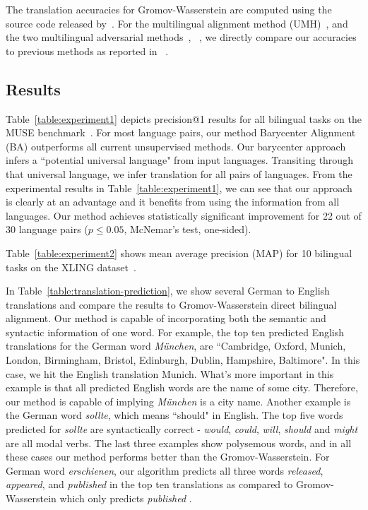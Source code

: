 \documentclass{article}
\begin{document}
The translation accuracies for Gromov-Wasserstein are computed using the source code released by~\cite{AlvarezMelisJaakkola18}.
For the multilingual alignment method (UMH)~\cite{AlauxGCJ19}, and the two multilingual adversarial methods~\cite{ChenCardie18}, ~\cite{TaitelbaumCG19a},
we directly compare our accuracies to previous methods as reported in ~\cite{glavas-etal-2019-properly}.


\subsection{Results} Table~\ref{table:experiment1} depicts precision@1 results for all bilingual tasks on the MUSE benchmark~\cite{LampleCRDJ18}. For most language pairs, our method Barycenter Alignment (BA) outperforms all current unsupervised methods. Our barycenter approach infers a ``potential universal language" from input languages. Transiting through that universal language, we infer translation for all pairs of languages. From the experimental results in Table~\ref{table:experiment1}, we can see that our approach is clearly at an advantage and it benefits from using the information from all languages. Our method achieves statistically significant improvement for 22 out of 30 language pairs ($p \leq 0.05$, McNemar's test, one-sided).

Table~\ref{table:experiment2} shows mean average precision (MAP) for 10 bilingual tasks on the XLING dataset~\cite{glavas-etal-2019-properly}.

 In Table~\ref{table:translation-prediction}, we show several German to English translations and compare the results to Gromov-Wasserstein direct bilingual alignment. Our method is capable of incorporating both the semantic and syntactic information of one word.
For example, the top ten predicted English translations for the German word \textit{München}, are ``Cambridge, Oxford, Munich, London, Birmingham, Bristol, Edinburgh, Dublin, Hampshire, Baltimore". In this case, we hit the English translation Munich. What's more important in this example is that all predicted English words are the name of some city. Therefore, our method is capable of implying \textit{München} is a city name.
Another example is the German word \textit{sollte}, which means ``should" in English.
The top five words predicted for \textit{sollte} are syntactically correct - \textit{would}, \textit{could}, \textit{will}, \textit{should} and \textit{might} are all modal verbs. 
The last three examples show polysemous words, and in all these cases our method performs better than the Gromov-Wasserstein. For German word \textit{erschienen}, our algorithm predicts all three words {\it released}, {\it appeared}, and {\it published} in the top ten translations as compared to Gromov-Wasserstein which only predicts {\it published }. 
\end{document}
